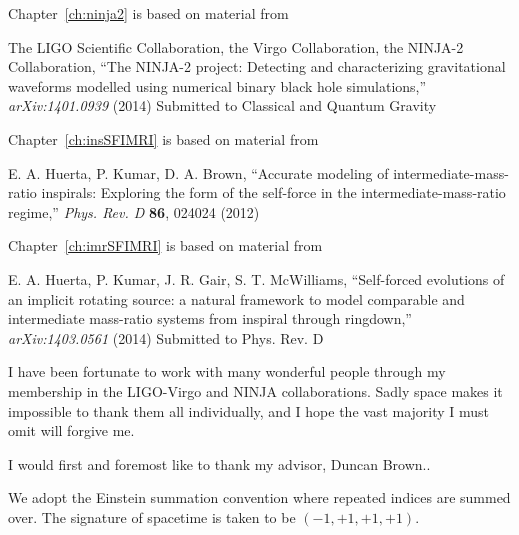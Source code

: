 \documentclass[12pt,notitlepage]{report}
\begin{document}
\noindent Chapter~\ref{ch:ninja2} is based on material from

\vspace*{0.25cm}

\noindent The LIGO Scientific Collaboration, the Virgo Collaboration, 
the NINJA-2 Collaboration, ``The NINJA-2 project: 
Detecting and characterizing gravitational waveforms modelled using 
numerical binary black hole simulations,''
{\it arXiv:1401.0939} (2014) {\rm Submitted to Classical and Quantum Gravity}

\vspace*{0.5cm}

\noindent Chapter~\ref{ch:insSFIMRI} is based on material from

\vspace*{0.25cm}

\noindent E. A. Huerta, P. Kumar, D. A. Brown, 
``Accurate modeling of intermediate-mass-ratio inspirals:
Exploring the form of the self-force in the intermediate-mass-ratio regime,''
{\it Phys. Rev. D} {\bf 86}, 024024 (2012)

\vspace*{0.5cm}

\noindent Chapter~\ref{ch:imrSFIMRI} is based on material from

\vspace*{0.25cm}

\noindent E. A. Huerta, P. Kumar, J. R. Gair, S. T. McWilliams, 
``Self-forced evolutions of an implicit rotating source:
a natural framework to model comparable and intermediate mass-ratio 
systems from inspiral through ringdown,''
{\it arXiv:1403.0561} (2014) {\rm Submitted to Phys. Rev. D}

\vspace*{0.5cm}



I have been fortunate to work with many wonderful people through my
membership in the LIGO-Virgo and NINJA collaborations.  Sadly space makes it
impossible to thank them all individually, and I hope the vast
majority I must omit will forgive me.

I would first and foremost like to thank my advisor, Duncan Brown..



We adopt the Einstein summation convention where repeated indices are
summed over.  
%
The signature of spacetime is taken to be $(-1,+1,+1,+1)$.
\end{document}
